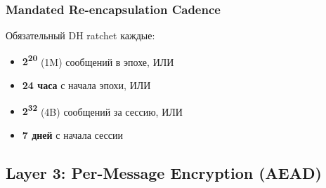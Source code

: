 \documentclass[11pt,a4paper,oneside]{book}
\begin{document}
\subsubsection{Mandated Re-encapsulation Cadence}
Обязательный DH ratchet каждые:
\begin{itemize}
  \item \textbf{2\textsuperscript{20}} (1M) сообщений в эпохе, ИЛИ
  \item \textbf{24 часа} с начала эпохи, ИЛИ
  \item \textbf{2\textsuperscript{32}} (4B) сообщений за сессию, ИЛИ
  \item \textbf{7 дней} с начала сессии
\end{itemize}
\vspace{-0.2cm}\subsection{Layer 3: Per-Message Encryption (AEAD)}
\end{document}
